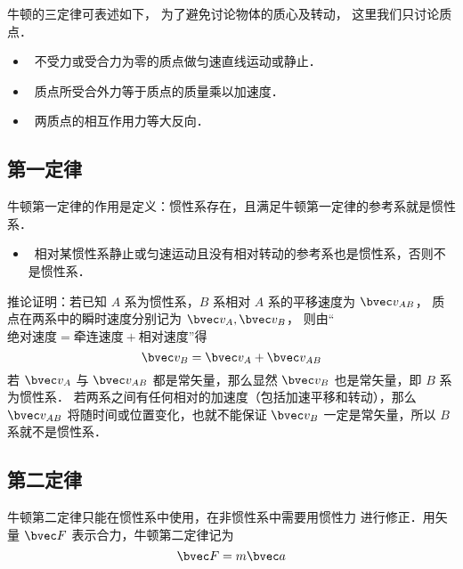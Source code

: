 

牛顿的三定律可表述如下， 为了避免讨论物体的质心及转动， 这里我们只讨论质点．
\begin{itemize}
\item {} \ 不受力或受合力为零的质点做匀速直线运动或静止．
\item {} \ 质点所受合外力等于质点的质量乘以加速度．
\item {} \ 两质点的相互作用力等大反向．
\end{itemize}

\subsection{第一定律}

牛顿第一定律的作用是定义：惯性系存在，且满足牛顿第一定律的参考系就是惯性系．

\begin{itemize}
\item {} \ 相对某惯性系静止或匀速运动且没有相对转动的参考系也是惯性系，否则不是惯性系．
\end{itemize}

推论证明：若已知 $A$ 系为惯性系，$B$ 系相对 $A$ 系的平移速度为 $\bvec v_{AB}$， 质点在两系中的瞬时速度分别记为 $\bvec v_A, \bvec v_B$， 则由“$\text{绝对速度} = \text{牵连速度} + \text{相对速度}$”得
\begin{equation}
\bvec v_{B} = \bvec v_{A} + \bvec v_{AB}
\end{equation}
若 $\bvec v_{A}$ 与 $\bvec v_{AB}$ 都是常矢量，那么显然 $\bvec v_{B}$ 也是常矢量，即 $B$ 系为惯性系． 若两系之间有任何相对的加速度（包括加速平移和转动），那么 $\bvec v_{AB}$ 将随时间或位置变化，也就不能保证 $\bvec v_B$ 一定是常矢量，所以 $B$ 系就不是惯性系．


\subsection{第二定律}
牛顿第二定律只能在惯性系中使用，在非惯性系中需要用惯性力 进行修正．用矢量 $\bvec F$ 表示合力，牛顿第二定律记为
\begin{equation}\label{New3_eq1}
\bvec F = m\bvec a
\end{equation}

